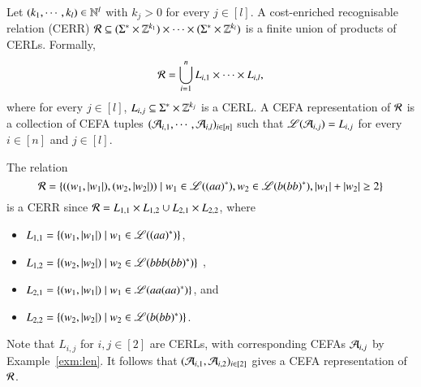 \begin{definition}
Let $(k_1,\cdots, k_l) \in \mathbb{N}^l$ with $k_j > 0$ for every $j \in [l]$. A cost-enriched recognisable relation (CERR)  $\mathcal{R} \subseteq (\Sigma^* \times \mathbb{Z}^{k_1}) \times \cdots  \times (\Sigma^* \times \mathbb{Z}^{k_l})$ is a finite union of products of CERLs. Formally,
	\[\mathcal{R} = \bigcup \limits_{i=1}^n L_{i,1 } \times \cdots \times L_{i, l},\]
	where for every $j \in [l]$, $L_{i,j} \subseteq \Sigma^* \times \mathbb{Z}^{k_j}$ is a CERL. 
	A CEFA representation of $\mathcal{R}$ is a collection of CEFA tuples $(\mathcal{A}_{i,1}, \cdots, \mathcal{A}_{i,l})_{i \in [n]}$ such that $\mathscr{L}(\mathcal{A}_{i,j}) = L_{i,j}$ for every $i \in [n]$ and $j \in [l]$.
\end{definition}

\begin{example}\label{exm:CERR}
The relation 
\[\mathcal{R}=\left\{((w_1, |w_1|), (w_2, |w_2|)) \mid  w_1 \in \mathscr{L}((aa)^*), w_2 \in \mathscr{L}(b(bb)^*), |w_1|+|w_2| \ge 2\right\}\] 
is a CERR since 
$\mathcal{R} = L_{1,1} \times L_{1,2} \cup L_{2,1} \times L_{2,2}$, where 
\begin{itemize}
\item $L_{1,1}=\{(w_1, |w_1|) \mid w_1 \in \mathscr{L}((aa)^*)\}$, 
\item $L_{1,2}=\{(w_2, |w_2|) \mid  w_2 \in \mathscr{L}(bbb(bb)^*)\}$ , 
\item $L_{2,1}=\{(w_1, |w_1|) \mid w_1 \in \mathscr{L}(aa(aa)^*)\}$,  and
\item $L_{2,2}=\{(w_2, |w_2|) \mid  w_2 \in \mathscr{L}(b(bb)^*)\}$. 
\end{itemize}
Note that $L_{i,j}$ for $i,j\in[2]$ are CERLs, with corresponding CEFAs $\mathcal{A}_{i,j}$ by  Example~\ref{exm:len}. It follows that %
$(\mathcal{A}_{i,1}, \mathcal{A}_{i,2})_{i \in [2]}$ gives a CEFA representation of $\mathcal{R}$. %
\end{example}

